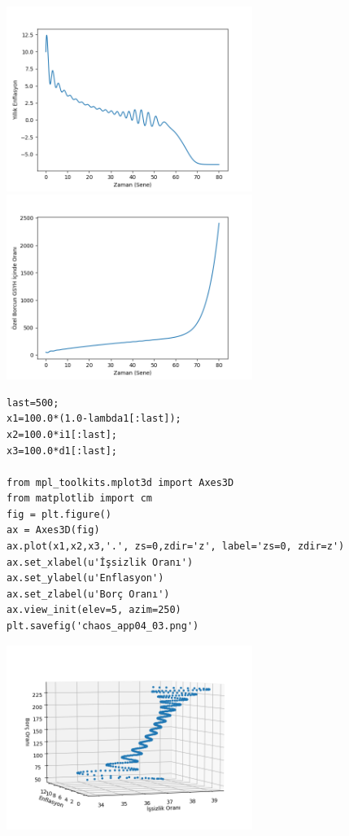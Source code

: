 \documentclass[12pt,fleqn]{article}\usepackage{../../common}
\begin{document}
\includegraphics[height=6cm]{chaos_app04_01.png}
\includegraphics[height=6cm]{chaos_app04_02.png}

\begin{verbatim}
last=500;
x1=100.0*(1.0-lambda1[:last]);
x2=100.0*i1[:last];
x3=100.0*d1[:last];

from mpl_toolkits.mplot3d import Axes3D
from matplotlib import cm
fig = plt.figure()
ax = Axes3D(fig)
ax.plot(x1,x2,x3,'.', zs=0,zdir='z', label='zs=0, zdir=z')
ax.set_xlabel(u'İşsizlik Oranı')
ax.set_ylabel(u'Enflasyon')
ax.set_zlabel(u'Borç Oranı')
ax.view_init(elev=5, azim=250)
plt.savefig('chaos_app04_03.png')
\end{verbatim}

\includegraphics[height=6cm]{chaos_app04_03.png}
\end{document}
